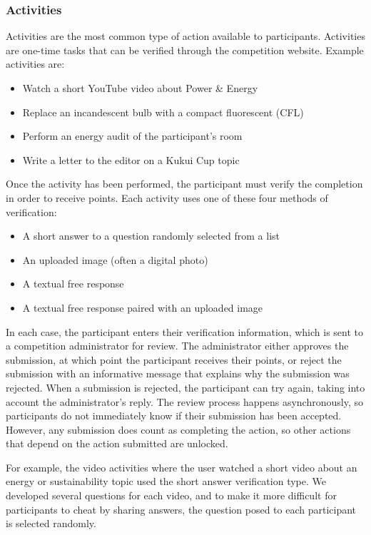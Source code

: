 \subsubsection{Activities}
\label{sec:activities}

Activities are the most common type of action available to participants. Activities are one-time tasks that can be verified through the competition website. Example activities are:

\begin{itemize}
	\item Watch a short YouTube video about Power \& Energy
	\item Replace an incandescent bulb with a compact fluorescent (CFL)
	\item Perform an energy audit of the participant's room
	\item Write a letter to the editor on a Kukui Cup topic
\end{itemize}

Once the activity has been performed, the participant must verify the completion in order to receive points. Each activity uses one of these four methods of verification:

\begin{itemize}
	\item A short answer to a question randomly selected from a list
	\item An uploaded image (often a digital photo)
	\item A textual free response
	\item A textual free response paired with an uploaded image
\end{itemize}

In each case, the participant enters their verification information, which is sent to a competition administrator for review. The administrator either approves the submission, at which point the participant receives their points, or reject the submission with an informative message that explains why the submission was rejected. When a submission is rejected, the participant can try again, taking into account the administrator's reply. The review process happens asynchronously, so participants do not immediately know if their submission has been accepted. However, any submission does count as completing the action, so other actions that depend on the action submitted are unlocked.

For example, the video activities where the user watched a short video about an energy or sustainability topic used the short answer verification type. We developed several questions for each video, and to make it more difficult for participants to cheat by sharing answers, the question posed to each participant is selected randomly.

